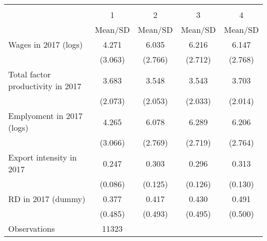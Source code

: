 {
\def\sym#1{\ifmmode^{#1}\else\(^{#1}\)\fi}
\begin{tabular}{l*{4}{c}}
\hline\hline
                    &\multicolumn{4}{c}{}                               \\
                    &           1&           2&           3&           4\\
                    &     Mean/SD&     Mean/SD&     Mean/SD&     Mean/SD\\
\hline
Wages in 2017 (logs)&       4.271&       6.035&       6.216&       6.147\\
                    &     (3.063)&     (2.766)&     (2.712)&     (2.768)\\
Total factor productivity in 2017&       3.683&       3.548&       3.543&       3.703\\
                    &     (2.073)&     (2.053)&     (2.033)&     (2.014)\\
Emplyoment in 2017 (logs)&       4.265&       6.078&       6.289&       6.206\\
                    &     (3.066)&     (2.769)&     (2.719)&     (2.764)\\
Export intensity in 2017&       0.247&       0.303&       0.296&       0.313\\
                    &     (0.086)&     (0.125)&     (0.126)&     (0.130)\\
RD in 2017 (dummy)  &       0.377&       0.417&       0.430&       0.491\\
                    &     (0.485)&     (0.493)&     (0.495)&     (0.500)\\
\hline
Observations        &       11323&            &            &            \\
\hline\hline
\end{tabular}
}
